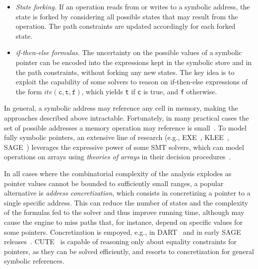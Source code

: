 \begin{itemize}

\item {\em State forking.} If an operation reads from or writes to a symbolic address, the state is forked by considering all possible states that may result from the operation. The path constraints are updated accordingly for each forked state.

\item {\em if-then-else formulas.} The uncertainty on the possible values of a symbolic pointer can be encoded into the expressions kept in the symbolic store and in the path constraints, without forking any new states. The key idea is to exploit the capability of some solvers to reason on if-then-else expressions of the form $ite(\texttt{c}, \texttt{t}, \texttt{f})$, which yields \texttt{t} if \texttt{c} is true, and \texttt{f} otherwise. %
\end{itemize}

\noindent In general, a symbolic address may reference any cell in memory, making the approaches described above intractable. Fortunately, in many practical cases the set of possible addresses a memory operation may reference is small~\cite{BITBLAZE-ICISS08}. To model fully symbolic pointers, an extensive line of research  (e.g., {\sc EXE}~\cite{EXE-CCS06}, {\sc KLEE}~\cite{KLEE-OSDI08}, {\sc SAGE}~\cite{EGL-ISSTA09}) leverages the expressive power of some SMT solvers, which can model operations on arrays using {\em theories of arrays} in their decision procedures~\cite{STP-CAV07}. 

In all cases where the combinatorial complexity of the analysis explodes as pointer values cannot be bounded to sufficiently small ranges, a popular alternative is {\em address concretization}, which consists in concretizing a pointer to a single specific address. This can reduce the number of states and the complexity of the formulas fed to the solver and thus improve running time, although may cause the engine to miss paths that, for instance, depend on specific values for some pointers. Concretization is empoyed, e.g., in {\sc DART}~\cite{DART-PLDI05} and in early {\sc SAGE} releases~\cite{SAGE-NDSS08}. {\sc CUTE}~\cite{CUTE-FSE13} is capable of reasoning only about equality constraints for pointers, as they can be solved efficiently, and resorts to concretization for general symbolic references. %

